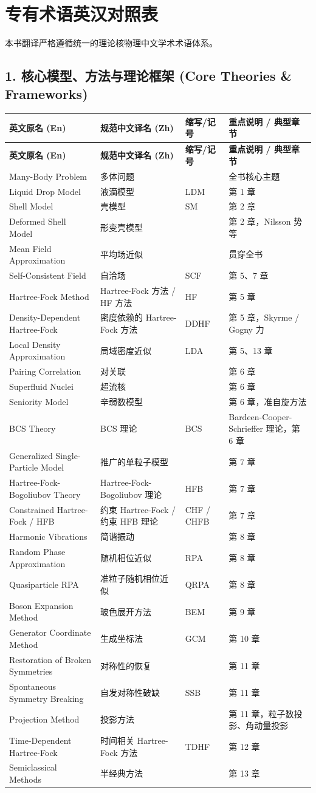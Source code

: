 
\chapter*{专有术语英汉对照表}


本书翻译严格遵循统一的理论核物理中文学术术语体系。


\section*{1. 核心模型、方法与理论框架 (Core Theories \& Frameworks)}

\begin{longtable}{p{4.2cm} p{4.2cm} p{1.6cm} p{4.5cm}}
\toprule
\textbf{英文原名 (En)} & \textbf{规范中文译名 (Zh)} & \textbf{缩写/记号} & \textbf{重点说明 / 典型章节} \tabularnewline
\midrule
\endfirsthead
\toprule
\textbf{英文原名 (En)} & \textbf{规范中文译名 (Zh)} & \textbf{缩写/记号} & \textbf{重点说明 / 典型章节} \tabularnewline
\midrule
\endhead
\bottomrule
\endfoot
\bottomrule
\endlastfoot
Many-Body Problem & 多体问题 &  & 全书核心主题 \tabularnewline
Liquid Drop Model & 液滴模型 & LDM & 第 1 章 \tabularnewline
Shell Model & 壳模型 & SM & 第 2 章 \tabularnewline
Deformed Shell Model & 形变壳模型 &  & 第 2 章，Nilsson 势等 \tabularnewline
Mean Field Approximation & 平均场近似 &  & 贯穿全书 \tabularnewline
Self-Consistent Field & 自洽场 & SCF & 第 5、7 章 \tabularnewline
Hartree-Fock Method & Hartree-Fock 方法 / HF 方法 & HF & 第 5 章 \tabularnewline
Density-Dependent Hartree-Fock & 密度依赖的 Hartree-Fock 方法 & DDHF & 第 5 章，Skyrme / Gogny 力 \tabularnewline
Local Density Approximation & 局域密度近似 & LDA & 第 5、13 章 \tabularnewline
Pairing Correlation & 对关联 &  & 第 6 章 \tabularnewline
Superfluid Nuclei & 超流核 &  & 第 6 章 \tabularnewline
Seniority Model & 辛弱数模型 &  & 第 6 章，准自旋方法 \tabularnewline
BCS Theory & BCS 理论 & BCS & Bardeen-Cooper-Schrieffer 理论，第 6 章 \tabularnewline
Generalized Single-Particle Model & 推广的单粒子模型 &  & 第 7 章 \tabularnewline
Hartree-Fock-Bogoliubov Theory & Hartree-Fock-Bogoliubov 理论 & HFB & 第 7 章 \tabularnewline
Constrained Hartree-Fock / HFB & 约束 Hartree-Fock / 约束 HFB 理论 & CHF / CHFB & 第 7 章 \tabularnewline
Harmonic Vibrations & 简谐振动 &  & 第 8 章 \tabularnewline
Random Phase Approximation & 随机相位近似 & RPA & 第 8 章 \tabularnewline
Quasiparticle RPA & 准粒子随机相位近似 & QRPA & 第 8 章 \tabularnewline
Boson Expansion Method & 玻色展开方法 & BEM & 第 9 章 \tabularnewline
Generator Coordinate Method & 生成坐标法 & GCM & 第 10 章 \tabularnewline
Restoration of Broken Symmetries & 对称性的恢复 &  & 第 11 章 \tabularnewline
Spontaneous Symmetry Breaking & 自发对称性破缺 & SSB & 第 11 章 \tabularnewline
Projection Method & 投影方法 &  & 第 11 章，粒子数投影、角动量投影 \tabularnewline
Time-Dependent Hartree-Fock & 时间相关 Hartree-Fock 方法 & TDHF & 第 12 章 \tabularnewline
Semiclassical Methods & 半经典方法 &  & 第 13 章 \tabularnewline
\end{longtable}

